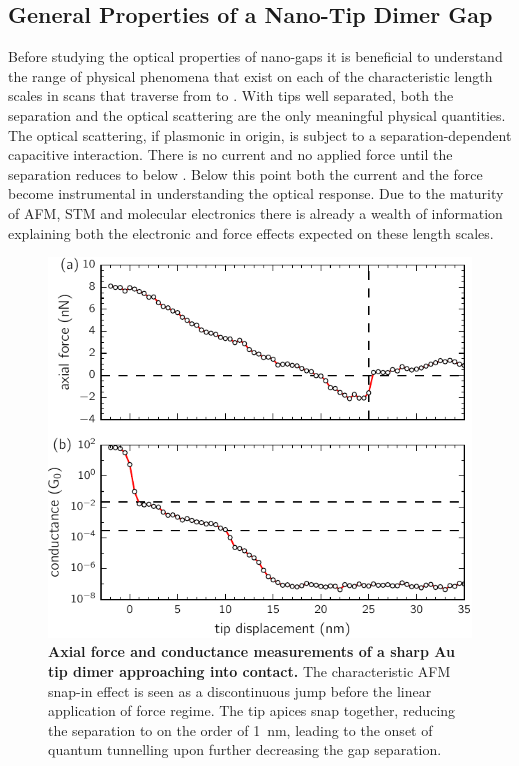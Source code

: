\documentclass[a4paper]{article}
\begin{document}
\subsection{General Properties of a Nano-Tip Dimer Gap}

Before studying the optical properties of nano-gaps it is beneficial to understand the range of physical phenomena that exist on each of the characteristic length scales in scans that traverse from  to . With tips well separated, both the separation and the optical scattering are the only meaningful physical quantities. The optical scattering, if plasmonic in origin, is subject to a separation-dependent capacitive interaction. There is no current and no applied force until the separation reduces to below . Below this point both the current and the force become instrumental in understanding the optical response. Due to the maturity of AFM, STM and molecular electronics there is already a wealth of information explaining both the electronic and force effects expected on these length scales.

\begin{figure}[bt]
\centering
\includegraphics{figures/tip_scanning_properties}
\caption[Axial force and conductance measurements of a sharp Au tip dimer approaching into contact]{\textbf{Axial force and conductance measurements of a sharp Au tip dimer approaching into contact.} The characteristic AFM snap-in effect is seen as a discontinuous jump before the linear application of force regime. The tip apices snap together, reducing the separation to on the order of \SI{1}{nm}, leading to the onset of quantum tunnelling upon further decreasing the gap separation.}
\label{fig:tip_scan_props}
\end{figure}
\end{document}
